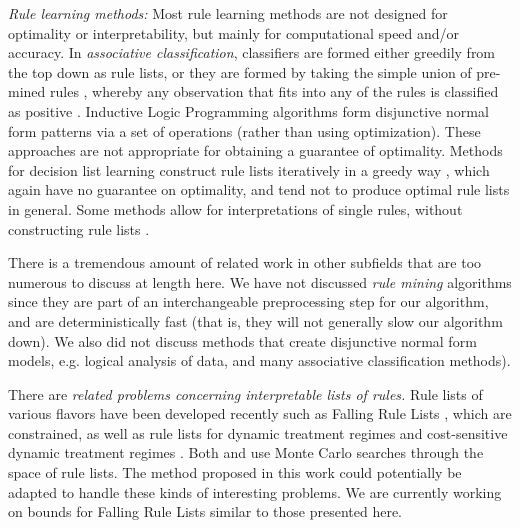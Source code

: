 \textit{Rule learning methods:} 
Most rule learning methods are not designed for optimality or interpretability, but mainly for computational speed and/or accuracy. In \textit{associative classification}, classifiers are formed either greedily from the top down as rule lists, \cite{Vanhoof10,Liu98,Li01,Yin03} or they are formed by taking the simple union of pre-mined rules \cite{??}, whereby any observation that fits into any of the rules is classified as positive \cite{??}. Inductive Logic Programming \cite{muggleton1994inductive} algorithms form disjunctive normal form patterns via a set of operations (rather than using optimization). These approaches are not appropriate for obtaining a guarantee of optimality. Methods for decision list learning construct rule lists iteratively in a greedy way
\cite{Rivest87,Sokolova03,Anthony05,Marchand05,RudinLeMa13,Goessling2015}, which again have no guarantee on optimality, and tend not to produce optimal rule lists in general. Some methods allow for interpretations of single rules, without constructing rule lists \citep{McCormick:2011ws}.

There is a tremendous amount of related work in other subfields that are too numerous to discuss at length here. We have not discussed \textit{rule mining} algorithms since they are part of an interchangeable preprocessing step for our algorithm, and are deterministically fast (that is, they will not generally slow our algorithm down). We also did not discuss methods that create disjunctive normal form models, e.g. logical analysis of data, and many associative classification methods). 

There are \textit{related problems concerning interpretable lists of rules.}
Rule lists of various flavors have been developed recently such as Falling Rule Lists \cite{WangRu}, which are constrained, as well as rule lists for dynamic treatment regimes \cite{ZhangEtAl15} and cost-sensitive dynamic treatment regimes \cite{LakkarajuRu17}. Both \cite{WangRu} and \cite{LakkarajuRu17} use Monte Carlo searches through the space of rule lists. The method proposed in this work could potentially be adapted to handle these kinds of interesting problems. We are currently working on bounds for Falling Rule Lists \cite{ChenRu17} similar to those presented here. 




